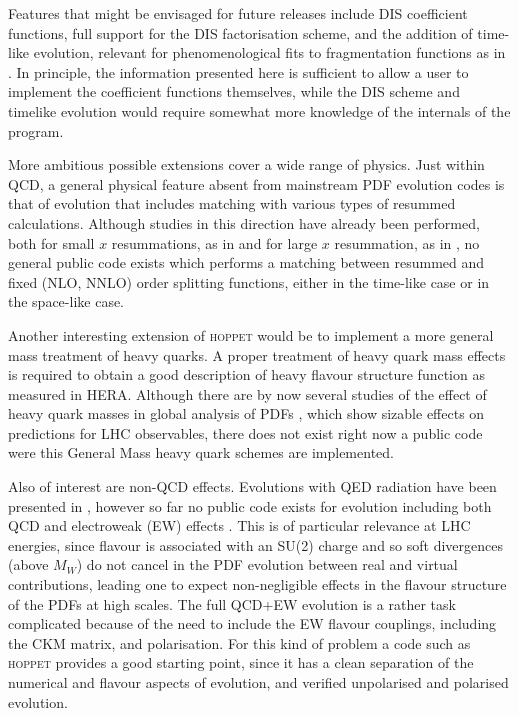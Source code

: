 \documentclass[12pt]{article}
\newcommand{\hoppet}{\textsc{hoppet}\xspace}
\begin{document}
Features that might be envisaged for future releases include DIS
coefficient functions, full support for the DIS factorisation scheme,
and the addition of time-like evolution, relevant
for phenomenological fits to fragmentation functions
as in \cite{de Florian:2007hc}.  
In principle, the
information presented here is sufficient to allow a user to implement
the coefficient functions themselves, while the DIS scheme and
timelike evolution would require somewhat more knowledge of the
internals of the program. 

More ambitious possible extensions cover a wide range of physics.
Just within QCD, a general physical feature absent from mainstream PDF
evolution codes is that of evolution that includes matching with
various types of resummed calculations. Although studies in this direction
have already been performed, both for small $x$ resummations, 
as in \cite{White:2005wm}
 and for large $x$ resummation, as in \cite{Corcella:2005us},
no general public code exists which performs a matching between
resummed 
 and fixed (NLO, NNLO) order
splitting functions, either in the time-like case or in
the space-like case. 

Another interesting extension of \hoppet would be to
implement a more general mass treatment of heavy quarks.
A proper treatment of heavy quark mass effects is required to
obtain a good description of heavy flavour structure function
as measured in HERA. Although there are by now several studies
of the effect of heavy quark masses in global analysis
of PDFs \cite{Martin:2007bv,Tung:2006tb},
 which show sizable effects on predictions for
LHC observables, there does not exist right now a public code
were this General Mass heavy quark schemes are implemented.

Also of interest are non-QCD effects. Evolutions with QED radiation
have been presented in \cite{Weinzierl:2002mv,Martin:2004dh}, 
however so far no public code
exists for evolution including both QCD and electroweak (EW) effects
\cite{Ciafaloni:2000df,Ciafaloni:2005fm}.
This is of particular relevance at LHC energies, since flavour is
associated with an SU(2) charge and so soft divergences (above $M_W$)
do not cancel in the PDF evolution between real and virtual
contributions, leading one to expect
non-negligible effects in the flavour structure of the PDFs at high
scales.
%
The full QCD+EW evolution is a rather task complicated because of the
need to include the EW flavour couplings, including the CKM matrix,
and polarisation. For this kind of problem a code such as \hoppet
provides a good starting point, since it has a clean separation of the
numerical and flavour aspects of evolution, and verified unpolarised
and polarised evolution.
\end{document}
